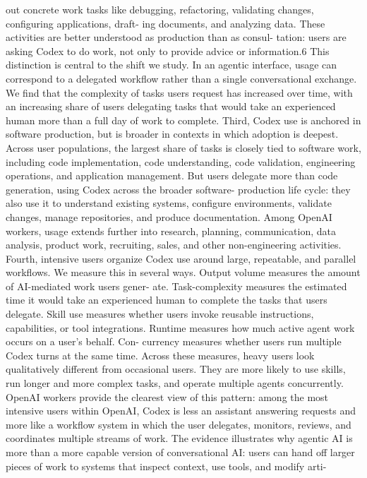 out concrete work tasks like debugging, refactoring, validating changes, configuring applications, draft-
ing documents, and analyzing data. These activities are better understood as production than as consul-
tation: users are asking Codex to do work, not only to provide advice or information.6 This distinction
is central to the shift we study. In an agentic interface, usage can correspond to a delegated workflow
rather than a single conversational exchange. We find that the complexity of tasks users request has
increased over time, with an increasing share of users delegating tasks that would take an experienced
human more than a full day of work to complete.
Third, Codex use is anchored in software production, but is broader in contexts in which adoption
is deepest. Across user populations, the largest share of tasks is closely tied to software work, including
code implementation, code understanding, code validation, engineering operations, and application
management. But users delegate more than code generation, using Codex across the broader software-
production life cycle: they also use it to understand existing systems, configure environments, validate
changes, manage repositories, and produce documentation. Among OpenAI workers, usage extends
further into research, planning, communication, data analysis, product work, recruiting, sales, and other
non-engineering activities.
Fourth, intensive users organize Codex use around large, repeatable, and parallel workflows. We
measure this in several ways. Output volume measures the amount of AI-mediated work users gener-
ate. Task-complexity measures the estimated time it would take an experienced human to complete the
tasks that users delegate. Skill use measures whether users invoke reusable instructions, capabilities,
or tool integrations. Runtime measures how much active agent work occurs on a user’s behalf. Con-
currency measures whether users run multiple Codex turns at the same time. Across these measures,
heavy users look qualitatively different from occasional users. They are more likely to use skills, run
longer and more complex tasks, and operate multiple agents concurrently. OpenAI workers provide the
clearest view of this pattern: among the most intensive users within OpenAI, Codex is less an assistant
answering requests and more like a workflow system in which the user delegates, monitors, reviews,
and coordinates multiple streams of work.
The evidence illustrates why agentic AI is more than a more capable version of conversational AI:
users can hand off larger pieces of work to systems that inspect context, use tools, and modify arti-
